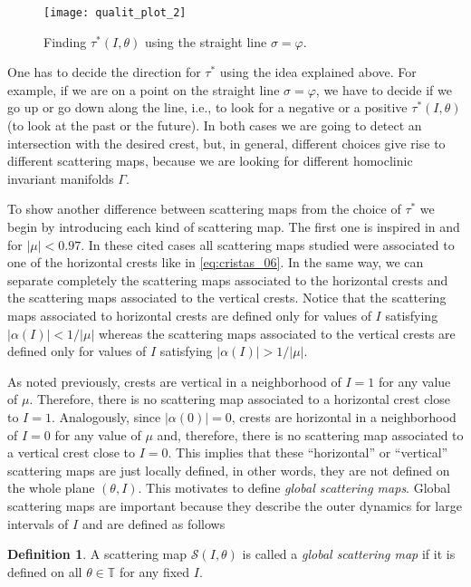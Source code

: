 \documentclass[a4paper,10pt]{article}
\newcommand{\NH}{\text{NHIM}}
\theoremstyle{definition}
\newtheorem{definition}[theorem]{Definition}
\begin{document}
\begin{figure}[h]
\centering
\texttt{[image: qualit\_plot\_2]}
\caption{Finding $\tau^*(I,\theta)$ using the straight line $\sigma = \varphi$.\label{fig:qual_plot}}
\end{figure}
One has to decide the direction for $\tau^*$ using the idea explained above.
For example, if we are on a point on the straight line $\sigma = \varphi$, we have to decide if we go up or go down along the {\NH} line, i.e., to look for a negative or a positive $\tau^*(I,\theta)$ (to look at the past or the future).
In both cases we are going to detect an intersection with the desired crest, but, in general, different choices give rise to different scattering maps, because we are looking for different homoclinic invariant manifolds $\Gamma$.

To show another difference between scattering maps from the choice of $\tau^*$ we begin by introducing each kind of scattering map.
The first one is inspired in \cite{Delshams2011} and \cite{Delshams2017} for $\left|\mu\right| < 0.97$.
In these cited cases all scattering maps studied were associated to one of the horizontal crests like in \eqref{eq:cristas_06}.
In the same way, we can separate completely the scattering maps associated to the horizontal crests and the scattering maps associated to the vertical crests.
Notice that the scattering maps associated to horizontal crests are defined only for values of $I$ satisfying $\left|\alpha(I)\right|< 1/\left|\mu\right|$ whereas the scattering maps associated to the vertical crests are defined only for values of $I$ satisfying $\left|\alpha(I)\right| > 1/\left|\mu\right|$.

As noted previously, crests are vertical in a neighborhood of $I = 1$ for any value of $\mu$.
Therefore, there is no scattering map associated to a horizontal crest close to $I=1$.
Analogously, since $\left|\alpha(0)\right| = 0$, crests are horizontal in a neighborhood of $I = 0$ for any value of $\mu$ and, therefore, there is no scattering map associated to a vertical crest close to $I = 0$.
This implies that these ``horizontal'' or ``vertical'' scattering maps are just locally defined, in other words, they are not defined on the whole plane $(\theta , I)$.
This motivates to define \emph{global scattering maps}.
Global scattering maps are important because they describe the outer dynamics for large intervals of $I$ and are defined as follows
\begin{definition}
A scattering map $\mathcal{S}(I,\theta)$ is called  a \emph{global scattering map} if it is defined on all $\theta\in\mathbb{T}$ for any fixed $I$.
\end{definition}
\end{document}

